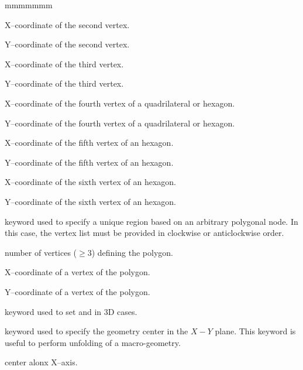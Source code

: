 \begin{ListeDeDescription}{mmmmmmm}
\item[\dusa{x2}] X--coordinate of the second vertex.

\item[\dusa{y2}] Y--coordinate of the second vertex.

\item[\dusa{x3}] X--coordinate of the third vertex.

\item[\dusa{y3}] Y--coordinate of the third vertex.

\item[\dusa{x4}] X--coordinate of the fourth vertex of a quadrilateral or hexagon.

\item[\dusa{y4}] Y--coordinate of the fourth vertex of a quadrilateral or hexagon.

\item[\dusa{x5}] X--coordinate of the fifth vertex of an hexagon.

\item[\dusa{y5}] Y--coordinate of the fifth vertex of an hexagon.

\item[\dusa{x6}] X--coordinate of the sixth vertex of an hexagon.

\item[\dusa{y6}] Y--coordinate of the sixth vertex of an hexagon.

\item[\moc{POLY}] keyword used to specify a unique region based on an arbitrary polygonal node. In this case, the vertex list must be provided in clockwise or anticlockwise order.

\item[\dusa{ncorn}] number of vertices ($\ge 3$) defining the polygon.

\item[\dusa{x}] X--coordinate of a vertex of the polygon.

\item[\dusa{y}] Y--coordinate of a vertex of the polygon.

\item[\moc{AXIAL}] keyword used to set  and  in 3D cases.

\item[\moc{CENTER}] keyword used to specify the geometry center in the $X-Y$ plane. This keyword is useful to perform unfolding of a macro-geometry.

\item[\dusa{x0}] center alonx X--axis.


\end{ListeDeDescription}
